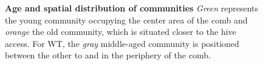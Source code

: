 \begin{figure}[htbp]
	
	\caption[Age and spatial distribution of communities]{
	\textbf{Age and spatial distribution of communities}
	\emph{Green} represents the young community occupying the center area of the comb and \emph{orange} the old community, which is situated closer to the hive access.
	For WT, the \emph{gray} middle-aged community is positioned between the other to and in the periphery of the comb.}
	\label{fig:n3-communities}
\end{figure}